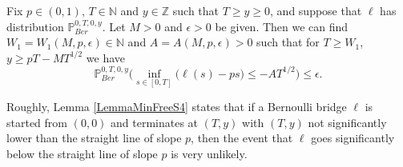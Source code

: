 \begin{lemma}\label{LemmaMinFreeS4} Fix $p \in (0,1)$, $T \in \mathbb{N}$ and $y\in \mathbb{Z}$ such that $T \geq y \geq 0$, and suppose that $\ell$ has distribution $\mathbb{P}^{0,T,0,y}_{Ber}$. Let $M > 0$ and $\epsilon > 0$ be given. Then we can find $W_1=W_1(M,p, \epsilon) \in \mathbb{N}$ and $A=A(M,p, \epsilon) > 0$ such that for $T \geq W_1$, $ y \geq p T -  MT^{1/2}$ we have
\begin{equation}\label{minFree1S4}
\mathbb{P}^{0,T,0,y}_{Ber}\Big( \inf_{s \in [ 0, T]}\big( \ell(s) -  ps \big) \leq -AT^{1/2} \Big) \leq \epsilon.
\end{equation}
\end{lemma}
\begin{remark} Roughly, Lemma \ref{LemmaMinFreeS4} states that if a Bernoulli bridge $\ell$ is started from $(0,0)$ and terminates at $(T,y)$ with $(T,y)$ not significantly lower than the straight line of slope $p$, then the event that $\ell$ goes significantly below the straight line of slope $p$ is very unlikely.
\end{remark}
